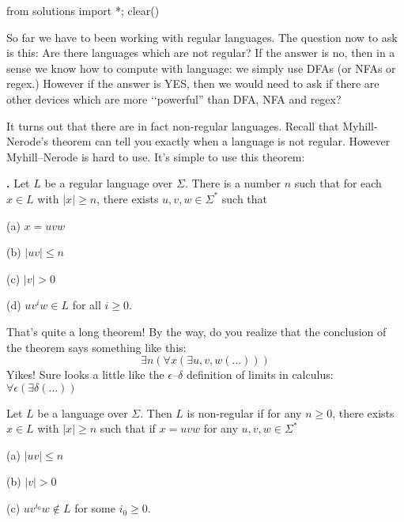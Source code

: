 \begin{python0}
from solutions import *; clear()
\end{python0}

So far we have to been working 
with regular languages.
The question now to ask is this:
Are there languages which are not regular?
If the answer is no, then in a sense we know how to compute with language:
we simply use DFAs (or NFAs or regex.)
However if the answer is YES, then we would need to ask if there are other
devices which are more \lq\lq powerful'' than
DFA, NFA and regex?

It turns out that there are in fact non-regular languages.
Recall that Myhill-Nerode's theorem can tell you exactly
when a language is not regular.
However Myhill--Nerode is hard to use.
It's simple to use this theorem:

\begin{thm}\textbf{.}
Let $L$ be a regular language over $\Sigma$. There is a number $n$
such that for each $x \in L$ with $|x| \geq n$, there exists $u,v,w
\in \Sigma^*$ such that
\begin{tightlist}
  \item[\textnormal{(a)}] $x = uvw$
  \item[\textnormal{(b)}] $|uv| \leq n$
  \item[\textnormal{(c)}] $|v| > 0$
  \item[\textnormal{(d)}] $uv^iw \in L$ for all $i \geq 0$.
\end{tightlist}
\end{thm}

That's quite a long theorem!
By the way, do you realize that the conclusion of the theorem
says something like this:
\[
\exists n \left( \forall x \left( \exists u,v,w (...) \right) \right)
\]
Yikes!
Sure looks a little like the $\epsilon$--$\delta$ definition
of limits in calculus:
$\forall \epsilon ( \exists \delta (...))$

\begin{cor}
Let $L$ be a language over $\Sigma$. Then $L$ is non-regular if for
any $n \geq 0$, there exists $x \in L$ with $|x| \geq n$ such
that if $x=uvw$ for any $u,v,w \in \Sigma^*$
 \begin{tightlist}
  \item[\textnormal{(a)}] $|uv| \leq n$
  \item[\textnormal{(b)}] $|v| > 0$
  \item[\textnormal{(c)}] $uv^{i_0}w \notin L$ for some $i_0 \geq 0$.
 \end{tightlist}
\end{cor}

